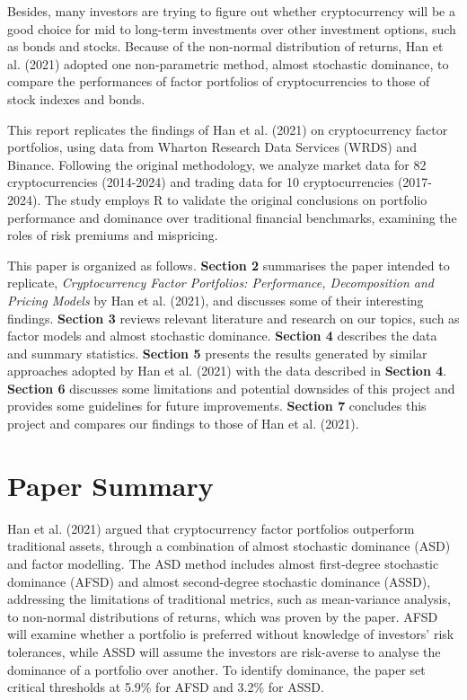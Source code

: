 \documentclass{article}
\begin{document}
Besides, many investors are trying to figure out whether cryptocurrency will be a good choice for mid to long-term investments over other investment options, such as bonds and stocks. Because of the non-normal distribution of returns, Han et al. (2021) adopted one non-parametric method, almost stochastic dominance, to compare the performances of factor portfolios of cryptocurrencies to those of stock indexes and bonds.

This report replicates the findings of Han et al. (2021) on cryptocurrency factor portfolios, using data from Wharton Research Data Services (WRDS) and Binance. Following the original methodology, we analyze market data for 82 cryptocurrencies (2014-2024) and trading data for 10 cryptocurrencies (2017-2024). The study employs R to validate the original conclusions on portfolio performance and dominance over traditional financial benchmarks, examining the roles of risk premiums and mispricing.

This paper is organized as follows. {\bf Section 2} summarises the paper intended to replicate, {\em Cryptocurrency Factor Portfolios: Performance, Decomposition and Pricing Models} by Han et al. (2021), and discusses some of their interesting findings. {\bf Section 3} reviews relevant literature and research on our topics, such as factor models and almost stochastic dominance. {\bf Section 4} describes the data and summary statistics. {\bf Section 5} presents the results generated by similar approaches adopted by Han et al. (2021) with the data described in {\bf Section 4}. {\bf Section 6} discusses some limitations and potential downsides of this project and provides some guidelines for future improvements. {\bf Section 7} concludes this project and compares our findings to those of Han et al. (2021). 

\hypertarget{paper-summary}{%
\section{Paper Summary}\label{paper-summary}}

Han et al. (2021) argued that cryptocurrency factor portfolios outperform traditional assets, through a combination of almost stochastic dominance (ASD) and factor modelling. The ASD method includes almost first-degree stochastic dominance (AFSD) and almost second-degree stochastic dominance (ASSD), addressing the limitations of traditional metrics, such as mean-variance analysis, to non-normal distributions of returns, which was proven by the paper. AFSD will examine whether a portfolio is preferred without knowledge of investors' risk tolerances, while ASSD will assume the investors are risk-averse to analyse the dominance of a portfolio over another. To identify dominance, the paper set critical thresholds at 5.9\% for AFSD and 3.2\% for ASSD.
\end{document}
